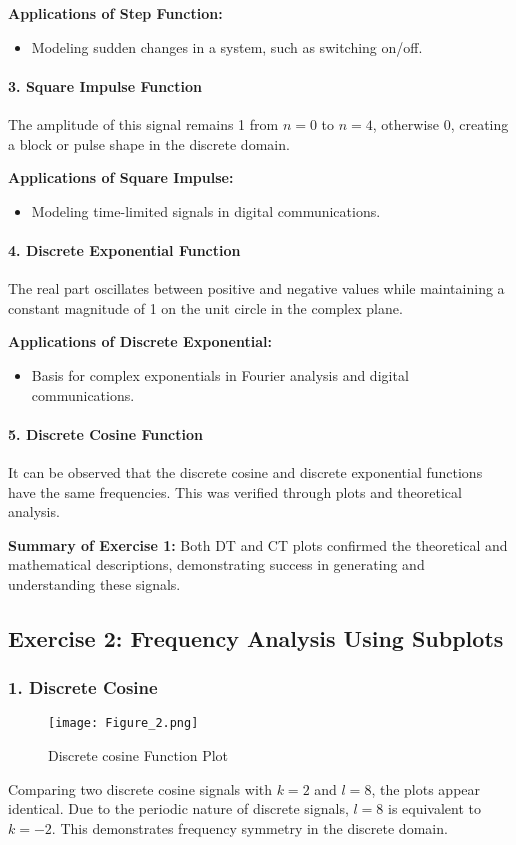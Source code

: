 \documentclass[12pt]{article}
\begin{document}
\textbf{Applications of Step Function:}
\begin{itemize}
    \item Modeling sudden changes in a system, such as switching on/off.
\end{itemize}

\paragraph{3. Square Impulse Function}
The amplitude of this signal remains 1 from \(n = 0\) to \(n = 4\), otherwise 0, creating a block or pulse shape in the discrete domain.

\textbf{Applications of Square Impulse:}
\begin{itemize}
    \item Modeling time-limited signals in digital communications.
\end{itemize}

\paragraph{4. Discrete Exponential Function}
The real part oscillates between positive and negative values while maintaining a constant magnitude of 1 on the unit circle in the complex plane.

\textbf{Applications of Discrete Exponential:}
\begin{itemize}
    \item Basis for complex exponentials in Fourier analysis and digital communications.
\end{itemize}

\paragraph{5. Discrete Cosine Function}
It can be observed that the discrete cosine and discrete exponential functions have the same frequencies. This was verified through plots and theoretical analysis.

\textbf{Summary of Exercise 1:}
Both DT and CT plots confirmed the theoretical and mathematical descriptions, demonstrating success in generating and understanding these signals.

\subsection{Exercise 2: Frequency Analysis Using Subplots}

\subsubsection{1. Discrete Cosine}
\begin{figure}[h]
    \centering
    \texttt{[image: Figure\_2.png]}
    \caption{Discrete cosine Function Plot}
    \label{fig:Discrete cosine}
\end{figure}
Comparing two discrete cosine signals with \(k = 2\) and \(l = 8\), the plots appear identical. Due to the periodic nature of discrete signals, \(l = 8\) is equivalent to \(k = -2\). This demonstrates frequency symmetry in the discrete domain.
\end{document}
